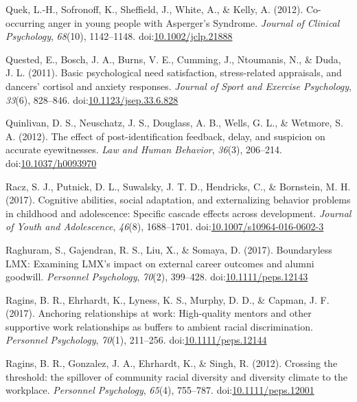 \documentclass[english,man]{apa6}
\theoremstyle{definition}
\theoremstyle{definition}
\theoremstyle{definition}
\theoremstyle{remark}
\begin{document}
\hypertarget{ref-Quek2012}{}
Quek, L.-H., Sofronoff, K., Sheffield, J., White, A., \& Kelly, A.
(2012). Co-occurring anger in young people with Asperger's Syndrome.
\emph{Journal of Clinical Psychology}, \emph{68}(10), 1142--1148.
doi:\href{https://doi.org/10.1002/jclp.21888}{10.1002/jclp.21888}

\hypertarget{ref-Quested2011}{}
Quested, E., Bosch, J. A., Burns, V. E., Cumming, J., Ntoumanis, N., \&
Duda, J. L. (2011). Basic psychological need satisfaction,
stress-related appraisals, and dancers' cortisol and anxiety responses.
\emph{Journal of Sport and Exercise Psychology}, \emph{33}(6), 828--846.
doi:\href{https://doi.org/10.1123/jsep.33.6.828}{10.1123/jsep.33.6.828}

\hypertarget{ref-Quinlivan2011}{}
Quinlivan, D. S., Neuschatz, J. S., Douglass, A. B., Wells, G. L., \&
Wetmore, S. A. (2012). The effect of post-identification feedback,
delay, and suspicion on accurate eyewitnesses. \emph{Law and Human
Behavior}, \emph{36}(3), 206--214.
doi:\href{https://doi.org/10.1037/h0093970}{10.1037/h0093970}

\hypertarget{ref-Racz2017}{}
Racz, S. J., Putnick, D. L., Suwalsky, J. T. D., Hendricks, C., \&
Bornstein, M. H. (2017). Cognitive abilities, social adaptation, and
externalizing behavior problems in childhood and adolescence: Specific
cascade effects across development. \emph{Journal of Youth and
Adolescence}, \emph{46}(8), 1688--1701.
doi:\href{https://doi.org/10.1007/s10964-016-0602-3}{10.1007/s10964-016-0602-3}

\hypertarget{ref-Raghuram2017}{}
Raghuram, S., Gajendran, R. S., Liu, X., \& Somaya, D. (2017).
Boundaryless LMX: Examining LMX's impact on external career outcomes and
alumni goodwill. \emph{Personnel Psychology}, \emph{70}(2), 399--428.
doi:\href{https://doi.org/10.1111/peps.12143}{10.1111/peps.12143}

\hypertarget{ref-Ragins2017}{}
Ragins, B. R., Ehrhardt, K., Lyness, K. S., Murphy, D. D., \& Capman, J.
F. (2017). Anchoring relationships at work: High-quality mentors and
other supportive work relationships as buffers to ambient racial
discrimination. \emph{Personnel Psychology}, \emph{70}(1), 211--256.
doi:\href{https://doi.org/10.1111/peps.12144}{10.1111/peps.12144}

\hypertarget{ref-Ragins2012}{}
Ragins, B. R., Gonzalez, J. A., Ehrhardt, K., \& Singh, R. (2012).
Crossing the threshold: the spillover of community racial diversity and
diversity climate to the workplace. \emph{Personnel Psychology},
\emph{65}(4), 755--787.
doi:\href{https://doi.org/10.1111/peps.12001}{10.1111/peps.12001}
\end{document}
